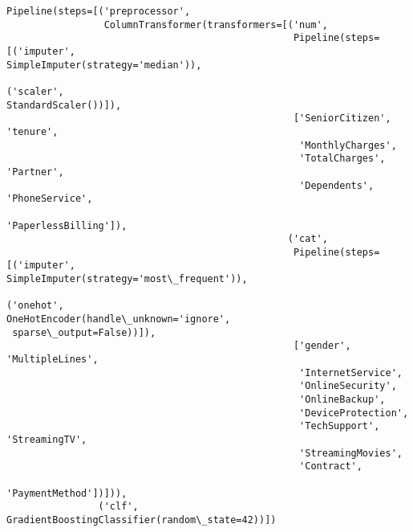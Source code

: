 \documentclass[11pt]{article}
\makeatletter
\newcommand{\boxspacing}{\kern\kvtcb@left@rule\kern\kvtcb@boxsep}
\newcommand{\prompt}[4]{
        {\ttfamily\llap{{\color{#2}[#3]:\hspace{3pt}#4}}\vspace{-\baselineskip}}
    }
\makeatother
\begin{document}
            \begin{tcolorbox}[breakable, size=fbox, boxrule=.5pt, pad at break*=1mm, opacityfill=0]
\prompt{Out}{outcolor}{28}{\boxspacing}
\begin{Verbatim}[commandchars=\\\{\}]
Pipeline(steps=[('preprocessor',
                 ColumnTransformer(transformers=[('num',
                                                  Pipeline(steps=[('imputer',
SimpleImputer(strategy='median')),
                                                                  ('scaler',
StandardScaler())]),
                                                  ['SeniorCitizen', 'tenure',
                                                   'MonthlyCharges',
                                                   'TotalCharges', 'Partner',
                                                   'Dependents', 'PhoneService',
                                                   'PaperlessBilling']),
                                                 ('cat',
                                                  Pipeline(steps=[('imputer',
SimpleImputer(strategy='most\_frequent')),
                                                                  ('onehot',
OneHotEncoder(handle\_unknown='ignore',
 sparse\_output=False))]),
                                                  ['gender', 'MultipleLines',
                                                   'InternetService',
                                                   'OnlineSecurity',
                                                   'OnlineBackup',
                                                   'DeviceProtection',
                                                   'TechSupport', 'StreamingTV',
                                                   'StreamingMovies',
                                                   'Contract',
                                                   'PaymentMethod'])])),
                ('clf', GradientBoostingClassifier(random\_state=42))])
\end{Verbatim}
\end{tcolorbox}
        
\end{document}
